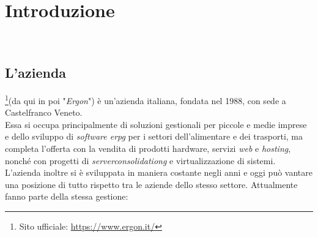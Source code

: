 

\chapter{Introduzione}
\label{cap:introduzione}

\noindent {}\\





\section{L'azienda}

\noindent{\myCompany}\footnote[1]{Sito ufficiale: \url{https://www.ergon.it/}}(da qui in poi "\textit{Ergon}") è un'azienda italiana, fondata nel 1988, 
con sede a Castelfranco Veneto.\\
Essa si occupa principalmente di soluzioni gestionali per piccole e medie imprese e dello sviluppo di \textit{software \gls{erpg}} per i settori dell'alimentare e dei trasporti,
ma completa l'offerta con la vendita di prodotti hardware, servizi \textit{web} e \textit{hosting}, nonché con progetti di \textit{\gls{serverconsolidationg}} e virtualizzazione di
sistemi.
L'azienda inoltre si è sviluppata in maniera costante negli anni e oggi può vantare una posizione di tutto rispetto tra le aziende dello stesso settore.
Attualmente fanno parte della stessa gestione:

